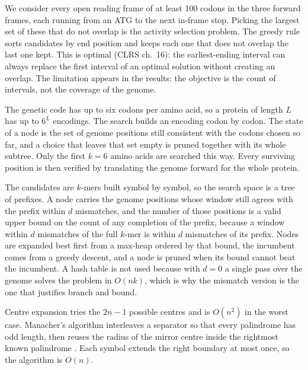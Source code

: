 We consider every open reading frame of at least 100 codons in the three forward frames, each
running from an ATG to the next in-frame stop. Picking the largest set of these that do not
overlap is the activity selection problem. The greedy rule sorts candidates by end position and
keeps each one that does not overlap the last one kept. This is optimal (CLRS ch.~16): the
earliest-ending interval can always replace the first interval of an optimal solution without
creating an overlap. The limitation appears in the results: the objective is the
count of intervals, not the coverage of the genome.

The genetic code has up to six codons per amino acid, so a protein of length $L$
has up to $6^L$ encodings. The search builds an encoding codon by codon. The state of a node is the
set of genome positions still consistent with the codons chosen so far, and a choice that leaves that
set empty is pruned together with its whole subtree. Only the first $k = 6$ amino acids are searched
this way. Every surviving position is then verified by translating the genome forward for the whole
protein.

The candidates are $k$-mers built symbol by symbol, so the search space is a tree of
prefixes. A node carries the genome positions whose window still agrees with the prefix within $d$
mismatches, and the number of those positions is a valid upper bound on the count of any completion
of the prefix, because a window within $d$ mismatches of the full $k$-mer is within $d$ mismatches of
its prefix. Nodes are expanded best first from a max-heap ordered by that bound, the incumbent comes
from a greedy descent, and a node is pruned when its bound cannot beat the incumbent. A hash table is
not used because with $d = 0$ a single pass over the genome solves the problem in $O(nk)$, which is
why the mismatch version is the one that justifies branch and bound.

Centre expansion tries the $2n - 1$ possible centres and is $O(n^2)$ in the worst case. Manacher's
algorithm interleaves a separator so that every palindrome has odd length, then reuses the radius of
the mirror centre inside the rightmost known palindrome \citep{manacher1975}. Each symbol extends the
right boundary at most once, so the algorithm is $O(n)$.
